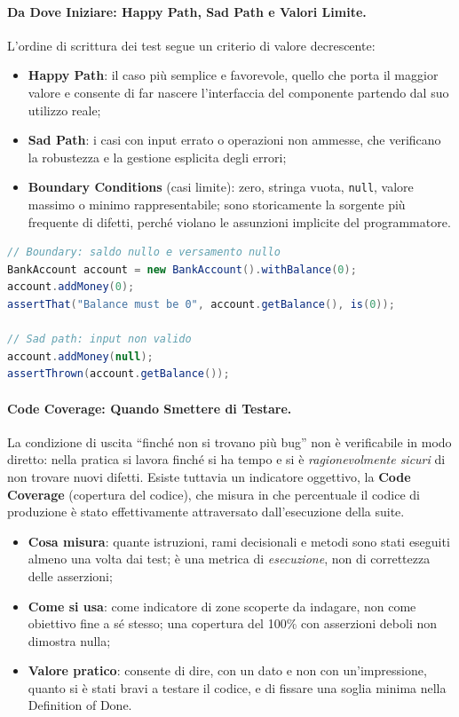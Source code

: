 \documentclass[12pt]{extarticle}
\begin{document}
\paragraph{Da Dove Iniziare: Happy Path, Sad Path e Valori Limite.}
L'ordine di scrittura dei test segue un criterio di valore decrescente:
\begin{itemize}
    \item \textbf{Happy Path}: il caso più semplice e favorevole, quello che porta il maggior valore e consente di far nascere l'interfaccia del componente partendo dal suo utilizzo reale;
    \item \textbf{Sad Path}: i casi con input errato o operazioni non ammesse, che verificano la robustezza e la gestione esplicita degli errori;
    \item \textbf{Boundary Conditions} (casi limite): zero, stringa vuota, \texttt{null}, valore massimo o minimo rappresentabile; sono storicamente la sorgente più frequente di difetti, perché violano le assunzioni implicite del programmatore.
\end{itemize}

\begin{lstlisting}[language=Java]
// Boundary: saldo nullo e versamento nullo
BankAccount account = new BankAccount().withBalance(0);
account.addMoney(0);
assertThat("Balance must be 0", account.getBalance(), is(0));

// Sad path: input non valido
account.addMoney(null);
assertThrown(account.getBalance());
\end{lstlisting}

\paragraph{Code Coverage: Quando Smettere di Testare.}
La condizione di uscita ``finché non si trovano più bug'' non è verificabile in modo diretto: nella pratica si lavora finché si ha tempo e si è \textit{ragionevolmente sicuri} di non trovare nuovi difetti. Esiste tuttavia un indicatore oggettivo, la \textbf{Code Coverage} (copertura del codice), che misura in che percentuale il codice di produzione è stato effettivamente attraversato dall'esecuzione della suite.
\begin{itemize}
    \item \textbf{Cosa misura}: quante istruzioni, rami decisionali e metodi sono stati eseguiti almeno una volta dai test; è una metrica di \textit{esecuzione}, non di correttezza delle asserzioni;
    \item \textbf{Come si usa}: come indicatore di zone scoperte da indagare, non come obiettivo fine a sé stesso; una copertura del 100\% con asserzioni deboli non dimostra nulla;
    \item \textbf{Valore pratico}: consente di dire, con un dato e non con un'impressione, quanto si è stati bravi a testare il codice, e di fissare una soglia minima nella Definition of Done.
\end{itemize}
\end{document}

